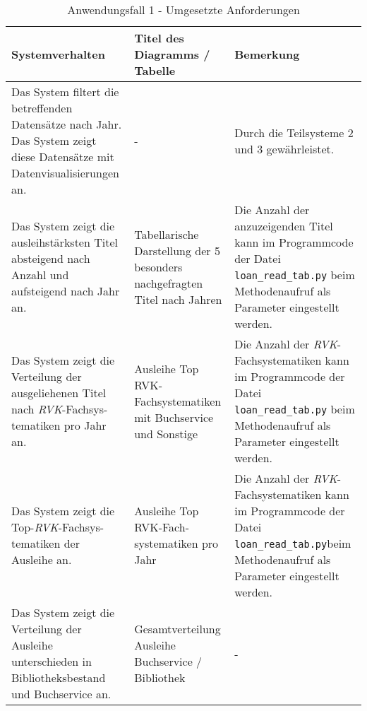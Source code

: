 \begingroup
    \setlength{\tabcolsep}{12pt} %
    \renewcommand{\arraystretch}{1.5} 
    \begin{table}[h]
        \Large
        \centering
        \begin{adjustbox}{max width=\textwidth}
        \begin{tabular}{p{}p{}p{}}
           \toprule
           Systemverhalten        &Titel des Diagramms / Tabelle &Bemerkung\\
           \midrule
           Das System filtert die betreffenden Datensätze nach Jahr. Das System zeigt diese Datensätze mit Datenvisualisierungen an.&-&Durch die Teilsysteme 2  und 3 gewährleistet.\\
           Das System zeigt die ausleihstärksten Titel absteigend nach Anzahl und aufsteigend nach Jahr an.&Tabellarische Darstellung der 5 besonders nachgefragten Titel nach Jahren&Die Anzahl der anzuzeigenden Titel kann im Programmcode der Datei \texttt{loan\_read\_tab.py} beim Methodenaufruf als Parameter eingestellt werden.\\
           Das System zeigt die Verteilung der ausgeliehenen Titel nach \textit{\acrshort{RVK}}-Fachsys-tematiken pro Jahr an.&Ausleihe Top RVK-Fachsystematiken mit Buchservice und Sonstige&Die Anzahl der \textit{\acrshort{RVK}}-Fachsystematiken kann im Programmcode der Datei \texttt{loan\_read\_tab.py} beim Methodenaufruf als Parameter eingestellt werden.\\
           Das System zeigt die Top-\textit{\acrshort{RVK}}-Fachsys-tematiken der Ausleihe an.&Ausleihe Top RVK-Fach-systematiken pro Jahr\footnotemark&Die Anzahl der \textit{\acrshort{RVK}}-Fachsystematiken kann im Programmcode der Datei \texttt{loan\_read\_tab.py}beim Methodenaufruf als Parameter eingestellt werden.\\
           Das System zeigt die Verteilung der Ausleihe unterschieden in Bibliotheksbestand und Buchservice an.&Gesamtverteilung Ausleihe Buchservice / Bibliothek&-\\
        \bottomrule
        \end{tabular}
        \end{adjustbox}
        \caption{%
            Anwendungsfall 1 - Umgesetzte Anforderungen
        }
        \label{tab:Anwendungsfall 1 - Umgesetzte Anforderungen}
        \end{table}



